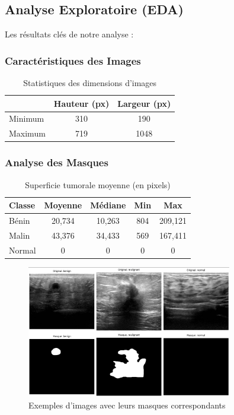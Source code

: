\documentclass[a4paper,12pt]{article}
\begin{document}
\subsection{Analyse Exploratoire (EDA)}
Les résultats clés de notre analyse :

\subsubsection{Caractéristiques des Images}
\begin{table}[h]
    \centering
    \caption{Statistiques des dimensions d'images}
    \begin{tabular}{lcc}
        \toprule
        & Hauteur (px) & Largeur (px) \\
        \midrule
        Minimum & 310 & 190 \\
        Maximum & 719 & 1048 \\
        \bottomrule
    \end{tabular}
    \label{tab:dimensions}
\end{table}

\subsubsection{Analyse des Masques}
\begin{table}[h]
    \centering
    \caption{Superficie tumorale moyenne (en pixels)}
    \begin{tabular}{lcccc}
        \toprule
        Classe & Moyenne & Médiane & Min & Max \\
        \midrule
        Bénin & 20,734 & 10,263 & 804 & 209,121 \\
        Malin & 43,376 & 34,433 & 569 & 167,411 \\
        Normal & 0 & 0 & 0 & 0 \\
        \bottomrule
    \end{tabular}
    \label{tab:masks}
\end{table}

\begin{figure}[h]
    \centering
    \includegraphics[width=0.8\textwidth]{sample_images.png}
    \caption{Exemples d'images avec leurs masques correspondants}
    \label{fig:samples}
\end{figure}
\end{document}
